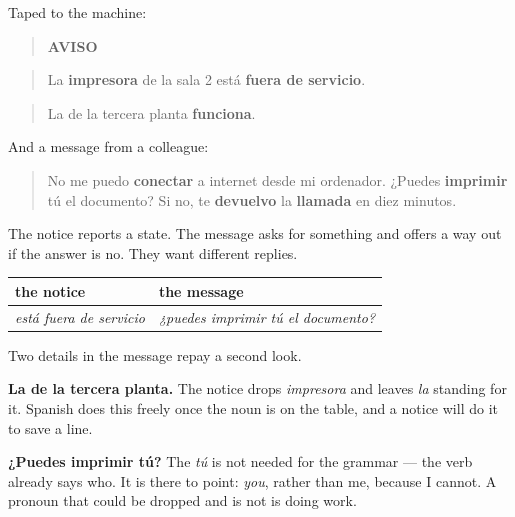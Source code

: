 \begin{tcolorbox}[breakable,skin=enhanced,colback=orange!6,colframe=orange!45!black,boxrule=0.5pt,arc=1mm,left=6pt,right=6pt,top=4pt,bottom=4pt,fonttitle=\bfseries,title={Read this}]
Taped to the machine:

\begin{quote}
\textbf{AVISO}
\end{quote}

\begin{quote}
La \textbf{impresora} de la sala 2 está \textbf{fuera de servicio}.
\end{quote}

\begin{quote}
La de la tercera planta \textbf{funciona}.
\end{quote}

And a message from a colleague:

\begin{quote}
No me puedo \textbf{conectar} a internet desde mi ordenador. ¿Puedes \textbf{imprimir} tú el documento? Si no, te \textbf{devuelvo} la \textbf{llamada} en diez minutos.
\end{quote}
\end{tcolorbox}

\begin{grammarlens}[title={Grammar Lens: what each text asks of you}]
The notice reports a state. The message asks for something and offers a way out if the answer is no. They want different replies.

\noindent
\begin{tabularx}{\linewidth}{@{}>{\raggedright\arraybackslash}X>{\raggedright\arraybackslash}X@{}}
\toprule
\textbf{the notice} & \textbf{the message} \\
\midrule
\emph{está fuera de servicio} & \emph{¿puedes imprimir tú el documento?} \\
\bottomrule
\end{tabularx}

Two details in the message repay a second look.

\textbf{La de la tercera planta.} The notice drops \emph{impresora} and leaves \emph{la} standing for it. Spanish does this freely once the noun is on the table, and a notice will do it to save a line.

\textbf{¿Puedes imprimir tú?} The \emph{tú} is not needed for the grammar — the verb already says who. It is there to point: \emph{you}, rather than me, because I cannot. A pronoun that could be dropped and is not is doing work.
\end{grammarlens}

